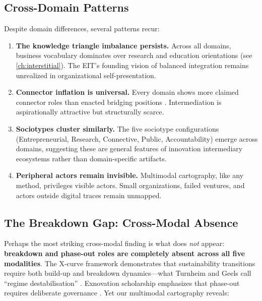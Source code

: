 \documentclass[../main.tex]{subfiles}
\begin{document}
\subsection{Cross-Domain Patterns}

Despite domain differences, several patterns recur:

\begin{enumerate}
\item \textbf{The knowledge triangle imbalance persists.} Across all domains, business vocabulary dominates over research and education orientations (see \cref{ch:interstitial}). The EIT's founding vision of balanced integration remains unrealized in organizational self-presentation.

\item \textbf{Connector inflation is universal.} Every domain shows more claimed connector roles than enacted bridging positions \cite{howells2006intermediation,kivimaa2019innovation}. Intermediation is aspirationally attractive but structurally scarce.

\item \textbf{Sociotypes cluster similarly.} The five sociotype configurations (Entrepreneurial, Research, Connective, Public, Accountability) emerge across domains, suggesting these are general features of innovation intermediary ecosystems rather than domain-specific artifacts.

\item \textbf{Peripheral actors remain invisible.} Multimodal cartography, like any method, privileges visible actors. Small organizations, failed ventures, and actors outside digital traces remain unmapped.
\end{enumerate}


\subsection{The Breakdown Gap: Cross-Modal Absence}

Perhaps the most striking cross-modal finding is what does \emph{not} appear: \textbf{breakdown and phase-out roles are completely absent across all five modalities}. The X-curve framework \parencite{hebinck2022xcurve} demonstrates that sustainability transitions require both build-up and breakdown dynamics---what Turnheim and Geels call ``regime destabilisation'' \parencite{turnheim2012destabilisation,turnheim2015regime}. Exnovation scholarship emphasizes that phase-out requires deliberate governance \parencite{david2017exnovation,davidson2019exnovating,heyen2017phaseout}. Yet our multimodal cartography reveals:
\end{document}
